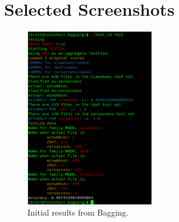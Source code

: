 \documentclass[12pt]{article}
\begin{document}
\section{Selected Screenshots}
  
          \begin{figure}[H]
          \centering
          \includegraphics[width=0.5\textwidth]{bagging1.png}
          \caption{Initial results from Bagging.}
          \label{bagging1}
          \end{figure}
 
\end{document}
